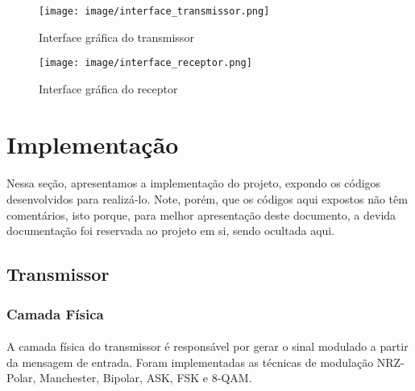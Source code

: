 \documentclass[12pt, a4paper]{article}
\begin{document}
\begin{figure}[ht]
    \centering
    \texttt{[image: image/interface\_transmissor.png]}
    \caption{Interface gráfica do transmissor}
\end{figure}

\begin{figure}[ht]
    \centering
    \texttt{[image: image/interface\_receptor.png]}
    \caption{Interface gráfica do receptor}
\end{figure}

\newpage

\section{Implementação}
\paragraph{}
Nessa seção, apresentamos a implementação do projeto, expondo os códigos desenvolvidos para realizá-lo. Note, porém, que os códigos aqui expostos não têm comentários, isto porque, para melhor apresentação deste documento, a devida documentação foi reservada ao projeto em si, sendo ocultada aqui.

\subsection{Transmissor}

\subsubsection{Camada Física}
\paragraph{}
A camada física do transmissor é responsável por gerar o sinal modulado a partir da mensagem de entrada. Foram implementadas as técnicas de modulação NRZ-Polar, Manchester, Bipolar, ASK, FSK e 8-QAM.
\end{document}
